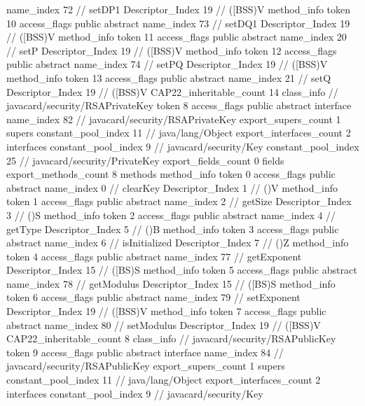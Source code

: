 {{{{{					name_index	72		// setDP1
					Descriptor_Index	19		// ([BSS)V
				}
				method_info {
					token	10
					access_flags	public abstract
					name_index	73		// setDQ1
					Descriptor_Index	19		// ([BSS)V
				}
				method_info {
					token	11
					access_flags	public abstract
					name_index	20		// setP
					Descriptor_Index	19		// ([BSS)V
				}
				method_info {
					token	12
					access_flags	public abstract
					name_index	74		// setPQ
					Descriptor_Index	19		// ([BSS)V
				}
				method_info {
					token	13
					access_flags	public abstract
					name_index	21		// setQ
					Descriptor_Index	19		// ([BSS)V
				}
			}
			CAP22_inheritable_count	14
		}
		class_info {		// javacard/security/RSAPrivateKey
			token	8
			access_flags	public abstract interface
			name_index	82		// javacard/security/RSAPrivateKey
			export_supers_count	1
			supers {
				constant_pool_index	11		// java/lang/Object
			}
			export_interfaces_count	2
			interfaces {
				constant_pool_index	9		// javacard/security/Key
				constant_pool_index	25		// javacard/security/PrivateKey
			}
			export_fields_count	0
			fields {
			}
			export_methods_count	8
			methods {
				method_info {
					token	0
					access_flags	public abstract
					name_index	0		// clearKey
					Descriptor_Index	1		// ()V
				}
				method_info {
					token	1
					access_flags	public abstract
					name_index	2		// getSize
					Descriptor_Index	3		// ()S
				}
				method_info {
					token	2
					access_flags	public abstract
					name_index	4		// getType
					Descriptor_Index	5		// ()B
				}
				method_info {
					token	3
					access_flags	public abstract
					name_index	6		// isInitialized
					Descriptor_Index	7		// ()Z
				}
				method_info {
					token	4
					access_flags	public abstract
					name_index	77		// getExponent
					Descriptor_Index	15		// ([BS)S
				}
				method_info {
					token	5
					access_flags	public abstract
					name_index	78		// getModulus
					Descriptor_Index	15		// ([BS)S
				}
				method_info {
					token	6
					access_flags	public abstract
					name_index	79		// setExponent
					Descriptor_Index	19		// ([BSS)V
				}
				method_info {
					token	7
					access_flags	public abstract
					name_index	80		// setModulus
					Descriptor_Index	19		// ([BSS)V
				}
			}
			CAP22_inheritable_count	8
		}
		class_info {		// javacard/security/RSAPublicKey
			token	9
			access_flags	public abstract interface
			name_index	84		// javacard/security/RSAPublicKey
			export_supers_count	1
			supers {
				constant_pool_index	11		// java/lang/Object
			}
			export_interfaces_count	2
			interfaces {
				constant_pool_index	9		// javacard/security/Key
}}}}
